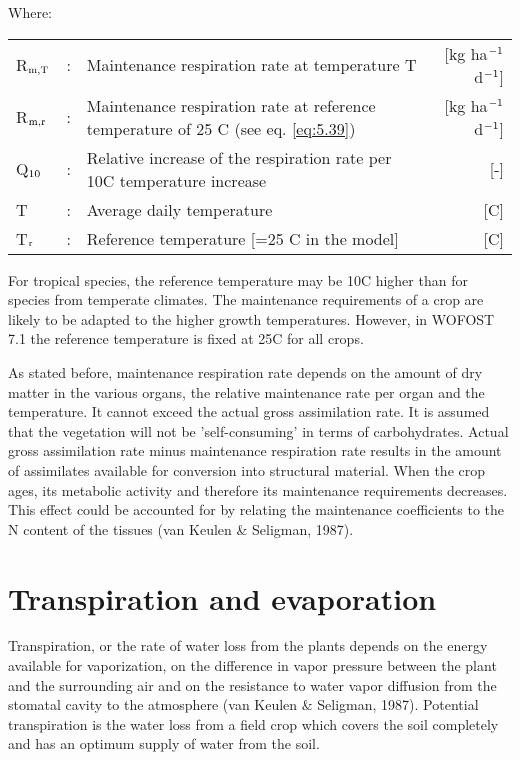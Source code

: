 Where:\\[5pt]
\begin{tabularx}{\textwidth}{llXr}
	R$_{{\rm m,T}}$ &:& Maintenance respiration rate at 
	temperature T &    [kg ha$^{{\rm -1}}$ d$^{{\rm -1}}$]\\
	R$_{{\rm m,r}}$ &:& Maintenance respiration rate at reference 
	temperature of 25 \degrees C (see eq. \ref{eq:5.39})   &     [kg ha$^{{\rm -1}}$ d$^{{\rm -1}}$]\\
	Q$_{{\rm 10}}$ &:& Relative increase of the respiration rate
	per 10\degrees C temperature increase    &    [-]\\
	T &:& Average daily temperature    &     [\degrees C]\\
	T$_{{\rm r}}$ &:& Reference temperature {\small [=25 \degrees C in 
		the model]}    &    [\degrees C]\\
\end{tabularx}


For tropical species, the reference temperature may be 10\degrees C higher than for species from
temperate climates. The maintenance requirements of a crop are likely to be adapted to
the higher growth temperatures. However, in WOFOST 7.1 the reference temperature is
fixed at 25\degrees C for all crops.

As stated before, maintenance respiration rate depends on the amount of dry matter in the
various organs, the relative maintenance rate per organ and the temperature. It cannot
exceed the actual gross assimilation rate. It is assumed that the vegetation will not be
'self-consuming' in terms of carbohydrates. Actual gross assimilation rate minus 
maintenance respiration rate results in the amount of assimilates available for conversion into
structural material. When the crop ages, its metabolic activity and therefore its
maintenance requirements decreases. This effect could be accounted for by relating 
the maintenance coefficients to the N content of the tissues (van Keulen \& Seligman, 1987).


\section{Transpiration and evaporation}
\label{sec:evapotranspiration}

Transpiration, or the rate of water loss from the plants depends on the energy available
for vaporization, on the difference in vapor pressure between the plant and the surrounding 
air and on the resistance to water vapor diffusion from the stomatal cavity to the
atmosphere (van Keulen \& Seligman, 1987). Potential transpiration is the water loss from
a field crop which covers the soil completely and has an optimum supply of water from
the soil. 

